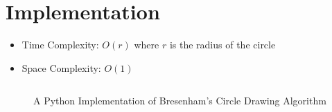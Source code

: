 \documentclass{article}
\begin{document}

\clearpage
\section{Implementation}

\begin{itemize}
    \item Time Complexity: \(O(r)\) where \(r\) is the radius of the circle
    \item Space Complexity: \(O(1)\)
\end{itemize}

\begin{figure}[H]
    \inputminted[fontsize=\small,frame=single,framerule=1pt]{python}{bresenham.py}
    \caption*{A Python Implementation of Bresenham's Circle Drawing Algorithm}
\end{figure}

\end{document}
